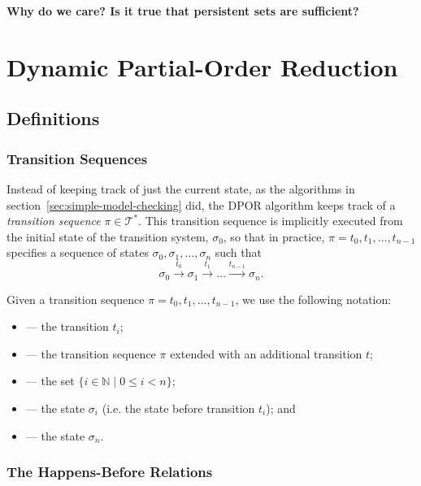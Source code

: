 \documentclass[12pt,a4paper,twoside,openright]{report}
\begin{document}
\textbf{Why do we care? Is it true that persistent sets are sufficient?}

\section{Dynamic Partial-Order Reduction}

\subsection{Definitions}

\subsubsection{Transition Sequences}
Instead of keeping track of just the current state, as
the algorithms in section~\ref{sec:simple-model-checking}
did, the DPOR algorithm keeps track of a \emph{transition
sequence} $\pi \in \mathcal{T}^*$. This transition
sequence is implicitly executed from the initial state of
the transition system, $\sigma_0$, so that in practice,
$\pi = t_0, t_1, \ldots, t_{n-1}$ specifies a sequence of states
$\sigma_0, \sigma_1, \ldots, \sigma_n$ such that
\[
	\sigma_0 \xrightarrow{\ t_0\ } \sigma_1 \xrightarrow{\ t_1\ }
	\ldots \xrightarrow{t_{n-1}} \sigma_n.
\]

Given a transition sequence $\pi = t_0, t_1, \ldots, t_{n-1}$,
we use the following notation:
\begin{itemize}[label={}]
	\newcommand{\defsindent}{3.5em}
	\item{\makebox[\defsindent]{\hfill$\pi_i$}
		--- the transition $t_i$;}
	\item{\makebox[\defsindent]{\hfill$\pi.t$}
		--- the transition sequence $\pi$ extended with
		an additional transition $t$;}
	\item{\makebox[\defsindent]{\hfill$\textit{dom}(\pi)$}
		--- the set $\{i \in \mathbb{N} \mid 0 \leq i < n \}$;}
	\item{\makebox[\defsindent]{\hfill$\textit{pre}(\pi, i)$}
		--- the state $\sigma_i$ (i.e. the state before transition $t_i$); and}
	\item{\makebox[\defsindent]{\hfill$\textit{last}(\pi)$}
		--- the state $\sigma_n$.}
\end{itemize}

\subsubsection{The Happens-Before Relations}
\end{document}
